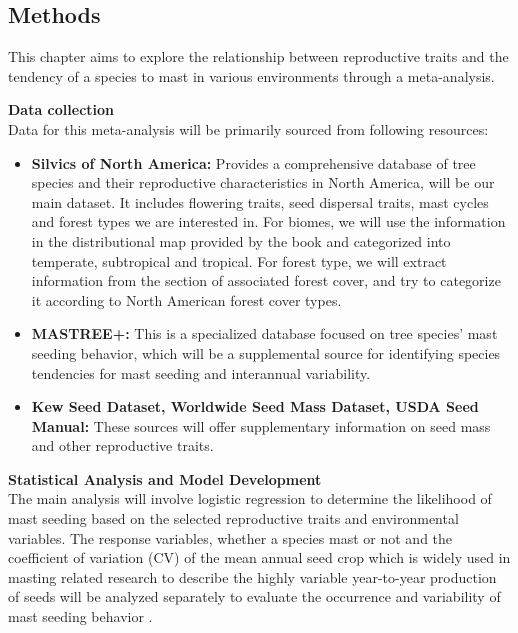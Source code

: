 \documentclass[11pt,letter]{article}
\begin{document}
\subsection{Methods}
This chapter aims to explore the relationship between reproductive traits and the tendency of a species to mast in various environments through a meta-analysis.\par
\textbf{Data collection}\\
Data for this meta-analysis will be primarily sourced from following resources:
	\begin{itemize}
	\item \textbf{Silvics of North America:} Provides a comprehensive database of tree species and their reproductive characteristics in North America, will be our main dataset. It includes flowering traits, seed dispersal traits, mast cycles and forest types we are interested in. For biomes, we will use the information in the distributional map provided by the book and categorized into temperate, subtropical and tropical. For forest type, we will extract information from the section of associated forest cover, and try to categorize it according to North American forest cover types.
	\item \textbf{MASTREE+:} This is a specialized database focused on tree species' mast seeding behavior, which will be a supplemental source for identifying species tendencies for mast seeding and interannual variability.
	\item \textbf{Kew Seed Dataset, Worldwide Seed Mass Dataset, USDA Seed Manual:} These sources will offer supplementary information on seed mass and other reproductive traits.
	\end{itemize}
\textbf{Statistical Analysis and Model Development}\\
The main analysis will involve logistic regression to determine the likelihood of mast seeding based on the selected reproductive traits and environmental variables. The response variables, whether a species mast or not and the coefficient of variation (CV) of the mean annual seed crop  which is widely used in masting related research to describe the highly variable year-to-year production of seeds will be analyzed separately to evaluate the occurrence and variability of mast seeding behavior \citep{kelly2002mast}.
\end{document}
